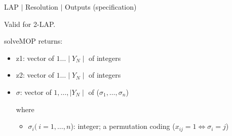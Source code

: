 %
% 
\begin{frame}{LAP $\mid$ Resolution $\mid$ Outputs (specification)}

Valid for 2-LAP.
\bigskip

solveMOP returns:
\medskip
                           \begin{itemize}
                              \item z1: vector of $1\dots \mid Y_N \mid $ of integers
                              \item z2: vector of $1\dots \mid Y_N \mid $ of integers
                              \item $\sigma$: vector of $1,\dots, \mid Y_N \mid $ of  ($\sigma_1, \dots, \sigma_n$)
                                                                                         
                              where
                               \begin{itemize}
                                     \item $\sigma_i (\ i=1,\dots,n$): integer;  a permutation coding ($x_{ij}=1 \Leftrightarrow \sigma_i=j$)
                                \end{itemize}
                           \end{itemize}               

\end{frame}

%
% 
